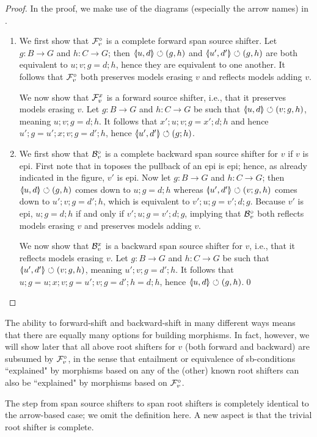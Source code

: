 \begin{proof}
In the proof, we make use of the diagrams (especially the arrow names) in .
\begin{enumerate}
\item We first show that $\mathcal{F}_v^\circ$ is a complete forward span source shifter. Let $g:B\to G$ and $h:C\to G$; then $\spanof{u}{d}\commutes (g,h)$ and $\spanof{u'}{d'}\commutes (g,h)$ are both equivalent to $u;v;g=d;h$, hence they are equivalent to one another. It follows that $\mathcal{F}_v^\circ$ both  preserves models erasing $v$ and reflects models adding $v$.

We now show that $\mathcal{F}_v^x$ is a forward source shifter, i.e., that it preserves models erasing $v$. Let $g:B\to G$ and $h:C\to G$ be such that $\spanof{u}{d}\commutes (v;g,h)$, meaning $u;v;g=d;h$. It follows that $x';u;v;g=x';d;h$ and hence $u';g=u';x;v;g=d';h$, hence $\spanof{u'}{d'}\commutes (g;h)$.

\item We first show that $\mathcal{B}_v^\circ$ is a complete backward span source shifter for $v$ if $v$ is epi. First note that in toposes the pullback of an epi is epi; hence, as already indicated in the figure, $v'$ is epi. Now let $g:B\to G$ and $h:C\to G$; then $\spanof{u}{d}\commutes (g,h)$ comes down to $u;g=d;h$ whereas $\spanof{u'}{d'}\commutes (v;g,h)$ comes down to $u';v;g=d';h$, which is equivalent to $v';u;g=v';d;g$. Because $v'$ is epi, $u;g=d;h$ if and only if $v';u;g=v';d;g$, implying that $\mathcal{B}_v^\circ$ both reflects models erasing $v$ and preserves models adding $v$.

We now show that $\mathcal{B}_v^x$ is a backward span source shifter for $v$, i.e., that it reflects models erasing $v$. Let $g:B\to G$ and $h:C\to G$ be such that $\spanof{u'}{d'}\commutes (v;g,h)$, meaning $u';v;g=d';h$. It follows that $u;g=u;x;v;g=u';v;g=d';h=d;h$, hence $\spanof u d\commutes (g,h)$.\qed
\end{enumerate}
\end{proof}
%
The ability to forward-shift and backward-shift in many different ways means that there are equally many options for building morphisms. In fact, however, we will show later that all above root shifters for $v$ (both forward and backward) are subsumed by $\mathcal{F}_v^\circ$, in the sense that entailment or equivalence of sb-conditions ``explained" by morphisms based on any of the (other) known root shifters can also be ``explained" by morphisms based on $\mathcal{F}_v^\circ$.

The step from span source shifters to span root shifters is completely identical to the arrow-based case; we omit the definition here. A new aspect is that the trivial root shifter is complete.

